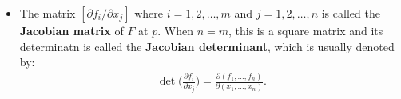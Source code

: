 \documentclass[10pt]{article}
\newcommand{\dee}{\mathrm{d}}
\begin{document}
\begin{itemize}
\begin{proof}
\begin{align*}
\begin{bmatrix}
          \vdots\\
          \big[ \frac{\partial f_m}{\partial x_1}\big]_{x_1=\alpha_1(0)} + \dotsb + \big[ \frac{\partial f_m}{\partial x_n}\big]_{x_n=\alpha_n(0)} \alpha_n'(0)
        \end{bmatrix}\\
        &= \begin{bmatrix}
          \frac{\partial f_1}{\partial x_1} & \frac{\partial f_1}{\partial x_2} & \cdots & \frac{\partial f_1}{\partial x_n}\\
          \frac{\partial f_2}{\partial x_1} & \frac{\partial f_2}{\partial x_2} & \cdots & \frac{\partial f_2}{\partial x_n}\\
          \vdots & \vdots & \ddots & \vdots\\
          \frac{\partial f_m}{\partial x_1} & \frac{\partial f_m}{\partial x_2} & \cdots & \frac{\partial f_m}{\partial x_n}
        \end{bmatrix}_{x=p}
        \begin{bmatrix}
          \alpha'_1(0)\\
          \alpha'_2(0)\\
          \vdots\\
          \alpha'_n(0)
        \end{bmatrix}\\
        &= \begin{bmatrix}
          \frac{\partial f_1}{\partial x_1} & \frac{\partial f_1}{\partial x_2} & \cdots & \frac{\partial f_1}{\partial x_n}\\
          \frac{\partial f_2}{\partial x_1} & \frac{\partial f_2}{\partial x_2} & \cdots & \frac{\partial f_2}{\partial x_n}\\
          \vdots & \vdots & \ddots & \vdots\\
          \frac{\partial f_m}{\partial x_1} & \frac{\partial f_m}{\partial x_2} & \cdots & \frac{\partial f_m}{\partial x_n}
        \end{bmatrix}_{x=p} w,
      \end{align*}
      and the matrix on the RHS is $\dee F_p$.
    \end{proof}

    \item The matrix $[ \partial f_i / \partial x_j ]$ where $i = 1, 2, \dotsc, m$ and $j = 1, 2, \dotsc, n$ is called the {\bf Jacobian matrix} of $F$ at $p$. When $n = m$, this is a square matrix and its determinatn is called the {\bf Jacobian determinant}, which is usually denoted by:
    \begin{align*}
      \det \bigg( \frac{\partial f_i}{\partial x_j} \bigg) = \frac{\partial(f_1, \dotsc, f_n)}{\partial(x_1, \dotsc, x_n)}.
    \end{align*}


\end{itemize}
\end{document}

